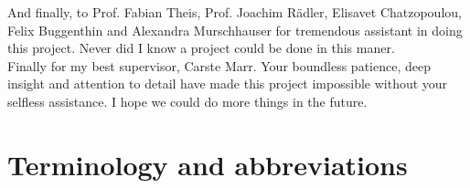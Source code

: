 \documentclass[pdftex,12pt,a4paper]{report}
\begin{document}
And finally, to Prof. Fabian Theis, Prof. Joachim R\"adler, Elisavet Chatzopoulou, Felix Buggenthin and Alexandra Murschhauser for tremendous assistant in doing this project. Never did I know a project could be done in this maner.\\

Finally for my best supervisor, Carste Marr. Your boundless patience, deep insight and attention to detail have made this project impossible without your selfless assistance. I hope we could do more things in the future. 

\newpage

\chapter*{Terminology and abbreviations}
\end{document}
